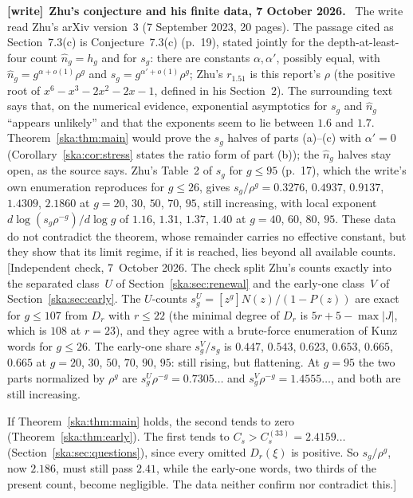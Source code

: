 \documentclass[11pt,letterpaper]{article}
\theoremstyle{definition}
\newenvironment{writenote}[1][]{\par\smallskip\begingroup\small
 \noindent\textbf{[write]}\if\relax\detokenize{#1}\relax\else~\textbf{#1.}\fi\ }%
 {\par\endgroup\smallskip}
\begin{document}
\begin{writenote}[Zhu's conjecture and his finite data, 7 October 2026]
The write read Zhu's arXiv version~3 (7 September 2023, 20 pages). The
passage cited as Section~7.3(c) is Conjecture~7.3(c) (p.~19), stated jointly
for the depth-at-least-four count $\hat n_g=h_g$ and for $s_g$: there are
constants $\alpha,\alpha'$, possibly equal, with $\hat n_g=g^{\alpha+o(1)}\rho^g$
and $s_g=g^{\alpha'+o(1)}\rho^g$; Zhu's $r_{1.51}$ is this report's $\rho$
(the positive root of $x^6-x^3-2x^2-2x-1$, defined in his Section~2). The
surrounding text says that, on the numerical evidence, exponential
asymptotics for $s_g$ and $\hat n_g$ ``appears unlikely'' and that the
exponents seem to lie between $1.6$ and $1.7$. Theorem~\ref{ska:thm:main}
would prove the $s_g$ halves of parts (a)--(c) with $\alpha'=0$
(Corollary~\ref{ska:cor:stress} states the ratio form of part (b)); the
$\hat n_g$ halves stay open, as the source says. Zhu's Table~2 of $s_g$ for
$g\le95$ (p.~17), which the write's
own enumeration reproduces for $g\le26$, gives $s_g/\rho^g=0.3276$, $0.4937$,
$0.9137$, $1.4309$, $2.1860$ at $g=20$, $30$, $50$, $70$, $95$, still
increasing, with local exponent $d\log(s_g\rho^{-g})/d\log g$ of $1.16$,
$1.31$, $1.37$, $1.40$ at $g=40$, $60$, $80$, $95$. These data do not
contradict the theorem, whose remainder carries no effective constant, but
they show that its limit regime, if it is reached, lies beyond all available
counts.
[Independent check, 7~October 2026. The check split Zhu's counts exactly
into the separated class~$U$ of Section~\ref{ska:sec:renewal} and the
early-one class~$V$ of Section~\ref{ska:sec:early}. The $U$-counts
$s^U_g=[z^g]N(z)/(1-P(z))$ are exact for $g\le107$ from $D_r$ with $r\le22$
(the minimal degree of $D_r$ is $5r+5-\max|J|$, which is $108$ at $r=23$),
and they agree with a brute-force
enumeration of Kunz words for $g\le26$. The early-one share $s^V_g/s_g$ is
$0.447$, $0.543$, $0.623$, $0.653$, $0.665$, $0.665$ at $g=20$, $30$, $50$,
$70$, $90$, $95$: still rising, but flattening. At $g=95$ the two parts
normalized by $\rho^g$ are $s^U_g\rho^{-g}=0.7305\ldots$ and
$s^V_g\rho^{-g}=1.4555\ldots$, and both are still increasing.

If Theorem~\ref{ska:thm:main} holds, the second tends to zero
(Theorem~\ref{ska:thm:early}). The first tends to
$C_s>C_s^{(33)}=2.4159\ldots$ (Section~\ref{ska:sec:questions}), since every
omitted $D_r(\xi)$ is positive. So $s_g/\rho^g$, now $2.186$, must still pass
$2.41$, while the early-one words, two thirds of the present count, become
negligible. The data neither confirm nor contradict this.]
\end{writenote}
\end{document}
